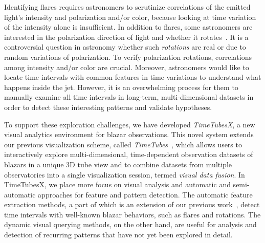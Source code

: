 Identifying flares requires astronomers to scrutinize correlations of the emitted light's intensity and polarization and/or color, because looking at time variation of the intensity alone is insufficient. %
%
In addition to flares, some astronomers are interested in the polarization direction of light and whether it rotates~\cite{Marscher2008, Uemura2017}.
It is a controversial question in astronomy whether such \textit{rotations} are real or due to random variations of polarization.
To verify polarization rotations, correlations among intensity and/or color are crucial.
Moreover, astronomers would like to locate time intervals with common features in  time variations
to understand what happens inside the jet.
However, it is an overwhelming process for them to manually examine all time intervals in long-term, multi-dimensional datasets in order to detect these interesting patterns and validate hypotheses.

To support these exploration challenges, 
we have developed \textit{TimeTubesX}, a new visual analytics environment for blazar observations. 
%
This novel system extends our previous visualization scheme, called \textit{TimeTubes}~\cite{Fujishiro2018}, 
which allows users to interactively explore multi-dimensional, time-dependent observation datasets of blazars in a unique 3D tube view and to combine datasets from multiple observatories into a single visualization session, termed \emph{visual data fusion}.
%
In TimeTubesX, we place more focus on visual analysis and automatic and semi-automatic approaches for feature and pattern detection.
The automatic feature extraction methods, a part of which is an extension of our previous work~\cite{Sawada2018}, detect time intervals with well-known blazar behaviors, such as flares and rotations.
The dynamic visual querying methods, on the other hand, are useful for analysis and detection of recurring patterns that have not yet been explored in detail. 

